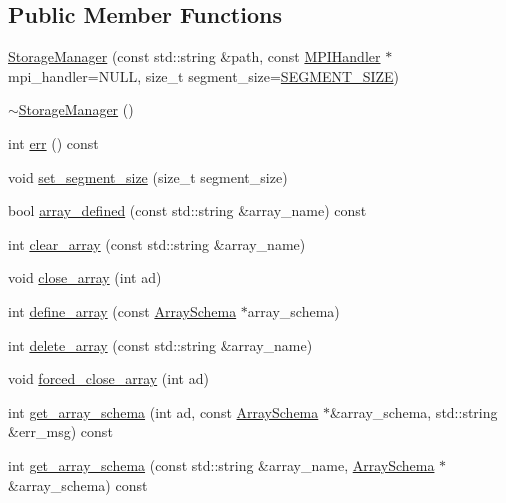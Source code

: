 \subsection*{Public Member Functions}
\begin{DoxyCompactItemize}
\item 
\hyperlink{classStorageManager_a7071b12eb47fd6a535a8d26ad466298e}{Storage\+Manager} (const std\+::string \&path, const \hyperlink{classMPIHandler}{M\+P\+I\+Handler} $\ast$mpi\+\_\+handler=N\+U\+L\+L, size\+\_\+t segment\+\_\+size=\hyperlink{special__values_8h_acbe07a3c3fe2056125230c357f85b870}{S\+E\+G\+M\+E\+N\+T\+\_\+\+S\+I\+Z\+E})
\item 
\hyperlink{classStorageManager_a10b35000dab64f83ee77d6847f0104c1}{$\sim$\+Storage\+Manager} ()
\item 
int \hyperlink{classStorageManager_a14d5a1f6f429513b5ecff122f3e66559}{err} () const 
\item 
void \hyperlink{classStorageManager_aac2b393b3767817d991fb88ff6c91ed7}{set\+\_\+segment\+\_\+size} (size\+\_\+t segment\+\_\+size)
\item 
bool \hyperlink{classStorageManager_a7132db9fd7d84701714150e2a8c8aa16}{array\+\_\+defined} (const std\+::string \&array\+\_\+name) const 
\item 
int \hyperlink{classStorageManager_ac94256a896d0b9f38daccdf88d073bd6}{clear\+\_\+array} (const std\+::string \&array\+\_\+name)
\item 
void \hyperlink{classStorageManager_a3713c351280d006c90c4153a2e8cad3b}{close\+\_\+array} (int ad)
\item 
int \hyperlink{classStorageManager_af35a50120983ab4778b76190134e137a}{define\+\_\+array} (const \hyperlink{classArraySchema}{Array\+Schema} $\ast$array\+\_\+schema)
\item 
int \hyperlink{classStorageManager_ae9a295f0da9291039eb988fe98acb399}{delete\+\_\+array} (const std\+::string \&array\+\_\+name)
\item 
void \hyperlink{classStorageManager_a50b93df7ce3a2360740862aef2bee92a}{forced\+\_\+close\+\_\+array} (int ad)
\item 
int \hyperlink{classStorageManager_a813989d59bf03222008993b3ea895bec}{get\+\_\+array\+\_\+schema} (int ad, const \hyperlink{classArraySchema}{Array\+Schema} $\ast$\&array\+\_\+schema, std\+::string \&err\+\_\+msg) const 
\item 
int \hyperlink{classStorageManager_a97bfad3c8345c01bd26903a427488140}{get\+\_\+array\+\_\+schema} (const std\+::string \&array\+\_\+name, \hyperlink{classArraySchema}{Array\+Schema} $\ast$\&array\+\_\+schema) const 

\end{DoxyCompactItemize}
